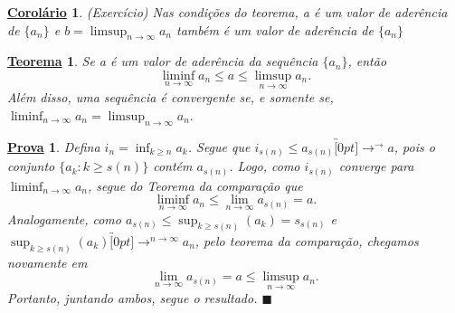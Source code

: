 \documentclass{article}
\newtheorem*{theorem*}{\underline{Teorema}}
\newtheorem*{proof*}{\underline{Prova}}
\newtheorem*{crl*}{\underline{Corol\'ario}}
\renewcommand\qedsymbol{$\blacksquare$}
\begin{document}
\begin{crl*}
  (Exerc\'icio) Nas condi\c c\~oes do teorema, a \'e um valor de ader\^encia de $\{a_{n}\}$ e $b = \limsup_{n\to\infty}a_{n}$ tamb\'em \'e um valor de
  ader\^encia de $\{a_{n}\}$
\end{crl*}
 \begin{theorem*}
   Se a \'e um valor de ader\^encia da sequ\^encia $\{a_{n}\} $, ent\~ao
   $$
     \liminf_{n\to\infty}a_{n}\leq{a}\leq{\limsup_{n\to\infty}a_{n}}.
   $$
   Al\'em disso, uma sequ\^encia \'e convergente se, e somente se, $\liminf_{n\to\infty}a_{n} = \limsup_{n\to\infty}a_{n}.$
 \end{theorem*}
\begin{proof*}
  Defina $i_{n} = \inf_{k\geq{n}}a_{k}$. Segue que $i_{s(n)}\leq{a_{s(n)}}\overbracket[0pt]{\longrightarrow}^{\to }a$, pois o conjunto
  $\{a_{k}: k\geq{s(n)}\}$ cont\'em $a_{s(n)}$. Logo, como $i_{s(n)}$ converge para $\liminf_{n\to\infty}a_{n}$, segue do Teorema da compara\c c\~ao que 
    $$
      \liminf_{n\to\infty}a_{n} \leq{\lim_{n\to\infty}a_{s(n)} = a}.
    $$
    Analogamente, como $a_{s(n)}\leq{\sup_{k\geq{s(n)}}{(a_{k})}} = s_{s(n)}$ e $\sup_{k\geq{s(n)}}{(a_{k})}\overbracket[0pt]{\longrightarrow}^{n\to\infty}a_{n}$, 
  pelo teorema da compara\c c\~ao, chegamos novamente em 
    $$
      \lim_{n\to\infty}a_{s(n)} = a \leq{\limsup_{n\to\infty}a_{n}}.
    $$
    Portanto, juntando ambos, segue o resultado. \qedsymbol
\end{proof*}
\end{document}

